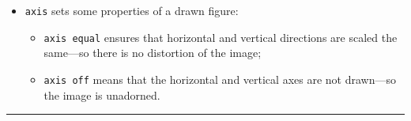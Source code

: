 \begin{table}
\begin{minipage}{\linewidth}
\begin{itemize}





\item {}\verb|axis| sets some properties of a drawn figure:
\begin{itemize}
\item \verb|axis equal| ensures that horizontal and vertical directions are scaled the same---so there is no distortion of the image;
\item \verb|axis off| means that the horizontal and vertical axes are not drawn---so the image is unadorned.
\end{itemize}


\end{itemize}
\end{minipage}
\smallskip\hrule
\end{table}








